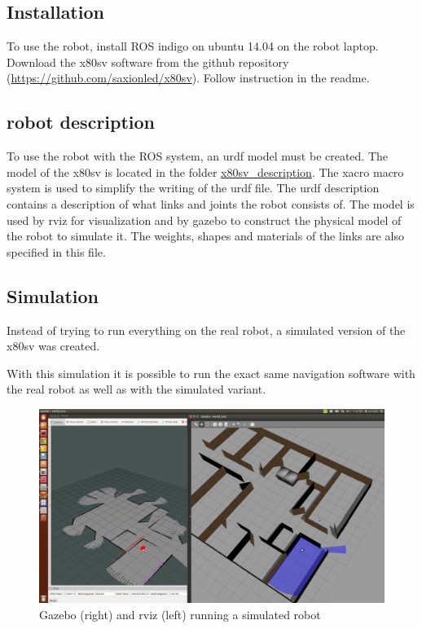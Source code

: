 \documentclass[a4paper]{article}
\begin{document}
\subsection{Installation}
To use the robot, install ROS indigo on ubuntu 14.04 on the robot laptop. Download the 
x80sv software from the github repository (\url{https://github.com/saxionled/x80sv}). Follow 
instruction in the readme.

\subsection{robot description}
To use the robot with the ROS system, an urdf model must be created. The model of the x80sv is
located in the folder \url{x80sv_description}. The xacro macro system is used to simplify the
writing of the urdf file. The urdf description contains a description of what links and joints
the robot consists of. The model is used by rviz for visualization and by gazebo to construct
the physical model of the robot to simulate it. The weights, shapes and materials of the links
are also specified in this file.


\subsection{Simulation}
Instead of trying to run everything on the real robot, a simulated version of the x80sv
was created.

With this simulation it is possible to run the exact same navigation software with the real
robot as well as with the simulated variant.

\begin{figure}[h!]
  \centering
  \includegraphics[width=\textwidth,height=\textheight,keepaspectratio]{img/office_sim_testgmapping.png}
  \caption{Gazebo (right) and rviz (left) running a simulated robot}
\end{figure}
\end{document}
